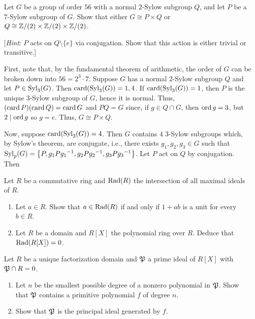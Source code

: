 \begin{problem}
  Let \(G\) be a group of order \(56\) with a normal \(2\)-Sylow subgroup
  \(Q\), and let \(P\) be a \(7\)-Sylow subgroup of \(G\). Show that either
  \(G\cong P\times Q\) or \(Q\cong\mathbb{Z}/(2)\times\mathbb{Z}/(2)\times\mathbb{Z}/(2)\).

  [\emph{Hint}: \(P\) acts on \(Q\setminus\{e\}\) via conjugation. Show
  that this action is either trivial or transitive.]
\end{problem}
\begin{solution}
  First, note that, by the fundamental theorem of arithmetic, the order of
  \(G\) can be broken down into \(56=2^3 \cdot 7\). Suppose \(G\) has a
  normal \(2\)-Sylow subgroup \(Q\) and let \(P\in\operatorname{Syl}_3(G)\). Then
  \(\operatorname{card}(\operatorname{Syl}_3(G))=1,4\). If \(\operatorname{card}(\operatorname{Syl}_3(G))=1\), then \(P\) is the
  unique \(3\)-Sylow subgroup of \(G\), hence it is normal. Thus,
  \((\operatorname{card} P)(\operatorname{card} Q)=\operatorname{card} G\) and \(PQ=G\) since, if \(g\in Q\cap G\),
  then \(\operatorname{ord} g=3\), but \(2\mid \operatorname{ord} g\) so \(g=e\). Thus,
  \(G\cong P\times Q\).

  Now, suppose \(\operatorname{card}(\operatorname{Syl}_3(G))=4\). Then \(G\) contains \(4\)
  \(3\)-Sylow subgroups which, by Sylow's theorem, are conjugate, i.e.,
  there exists \(g_1,g_2,g_3\in G\) such that
  \(\operatorname{Syl}_p(G)=\left\{P,g_1P{g_1}^{-1},g_2P{g_2}^{-1},g_3P{g_3}^{-1}\right\}\). Let
  \(P\) act on \(Q\) by conjugation. Then
\end{solution}

\begin{problem}
  Let \(R\) be a commutative ring and \(\operatorname{Rad}(R)\) the intersection of all
  maximal ideals of \(R\).
  \begin{enumerate}[label=(\alph*),noitemsep]
  \item Let \(a\in R\). Show that \(a\in\operatorname{Rad}(R)\) if and only if \(1+ab\)
    is a unit for every \(b\in R\).
  \item Let \(R\) be a domain and \(R[X]\) the polynomial ring over
    \(R\). Deduce that \(\operatorname{Rad}(R[X])=0\).
  \end{enumerate}
\end{problem}
\begin{solution}
\end{solution}

\begin{problem}
  Let \(R\) be a unique factorization domain and \(\mathfrak{P}\) a prime ideal
  of \(R[X]\) with \(\mathfrak{P}\cap R=0\).
  \begin{enumerate}[label=(\alph*),noitemsep]
  \item Let \(n\) be the smallest possible degree of a nonzero polynomial
    in \(\mathfrak{P}\). Show that \(\mathfrak{P}\) contains a primitive polynomial
    \(f\) of degree \(n\).
  \item Show that \(\mathfrak{P}\) is the principal ideal generated by \(f\).
  \end{enumerate}
\end{problem}
\begin{solution}
\end{solution}

